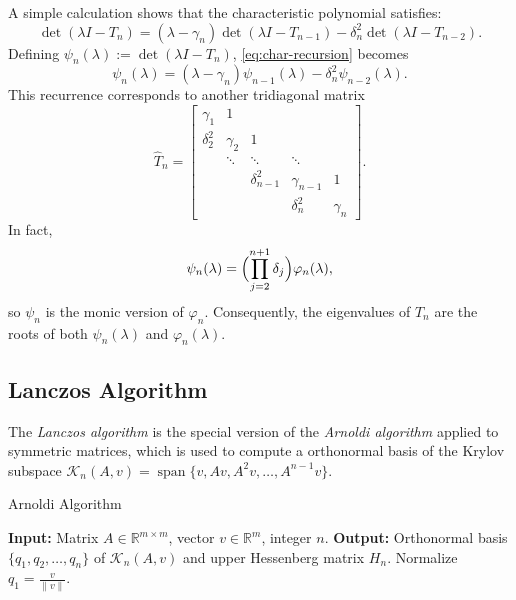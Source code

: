 \documentclass[a4paper, 10pt]{article}
\begin{document}
A simple calculation shows that the characteristic polynomial satisfies:
\begin{equation}\label{eq:char-recursion}
\det(\lambda I - T_n) = (\lambda - \gamma_n)\det(\lambda I - T_{n-1}) - \delta_n^2\det(\lambda I - T_{n-2}).
\end{equation}
Defining $\psi_n(\lambda):=\det(\lambda I - T_n)$, \eqref{eq:char-recursion} becomes
\begin{equation}\label{eq:psi-recursion}
\psi_n(\lambda) = (\lambda - \gamma_n)\psi_{n-1}(\lambda) - \delta_n^2\psi_{n-2}(\lambda).
\end{equation}
This recurrence corresponds to another tridiagonal matrix
\begin{equation}
\hat{T}_n =
\begin{bmatrix}
\gamma_1 & 1        &        &        &       \\
\delta_2^2 & \gamma_2 & 1      &        &       \\
           & \ddots  & \ddots & \ddots &       \\
           &         & \delta_{n-1}^2 & \gamma_{n-1} & 1 \\
           &         &        & \delta_n^2 & \gamma_n
\end{bmatrix}.
\end{equation}
In fact,
\[
\psi_n(\lambda) = \Bigl(\prod_{j=2}^{n+1}\delta_j\Bigr)\varphi_n(\lambda),
\]
so $\psi_n$ is the monic version of $\varphi_n$. Consequently, the eigenvalues of $T_n$ are the roots of both $\psi_n(\lambda)$ and $\varphi_n(\lambda)$.

\subsection{Lanczos Algorithm}
 
The \emph{Lanczos algorithm} is the special version of the \emph{Arnoldi algorithm} applied to symmetric matrices, which is used to compute a orthonormal basis of the Krylov subspace $\mathcal{K}_n(A, v) = \operatorname{span}\{v, Av, A^2v, \ldots, A^{n-1}v\}$. 

\begin{algorithm}[H]
    \caption{Arnoldi Algorithm}
    \label{alg:arnoldi}
    \begin{algorithmic}[1]
        \Statex \textbf{Input:}  Matrix $A\in\mathbb{R}^{m\times m}$, vector $v\in\mathbb{R}^m$, integer $n$.
        \Statex \textbf{Output:} Orthonormal basis $\{q_1, q_2, \ldots, q_n\}$ of $\mathcal{K}_n(A, v)$ and upper Hessenberg matrix $H_n$.
        \State Normalize $q_1 = \frac{v}{\|v\|}$.
    \end{algorithmic}
\end{algorithm}
\end{document}
